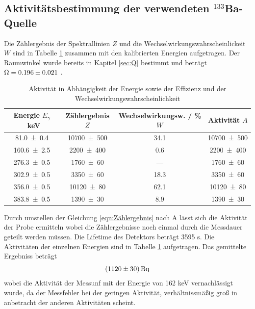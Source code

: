 \subsection{Aktivitätsbestimmung der verwendeten $^{133}$Ba-Quelle}
Die Zählergebnis der Spektrallinien $Z$ und die Wechselwirkungswahrscheinlickeit $W$ sind in Tabelle \ref{tab:Ba} zusammen mit den kalibrierten Energien aufgetragen. Der Raumwinkel wurde bereits in Kapitel \ref{sec:Q} bestimmt und beträgt $\Omega = \num{0.196 +- 0.021}$ .
\begin{table}
  \centering
  \caption{Aktivität in Abhängigkeit der Energie sowie der Effizienz und der Wechselwirkungswahrscheinlichkeit}
  \begin{tabular}{c c c c}
    \toprule
	Energie $E_\gamma$ \ keV & Zählergebnis $Z$ & Wechselwirkungsw. / \% $W$ & Aktivität $A$ \\
    \hline
    \num{81.0 +- 0.4}	& \num{10700 +- 500}	& 34.1	& \num{10700 +- 500}	\\
    \num{160.6 +- 2.5}	& \num{2200 +- 400}	& 0.6	& \num{2200 +- 400}	\\
    \num{276.3 +- 0.5}  & \num{1760 +- 60}	& --- 	& \num{1760 +- 60}	\\
    \num{302.9 +- 0.5}	& \num{3350 +- 60} 	& 18.3	& \num{3350 +- 60} 	\\
    \num{356.0 +- 0.5}	& \num{10120 +-	80}	& 62.1	& \num{10120 +-	80}	\\
    \num{383.8 +- 0.5}	& \num{1390 +- 30}	& 8.9	& \num{1390 +- 30}	\\
    \bottomrule
  \end{tabular}
  \label{tab:Ba}
\end{table}
Durch umstellen der Gleichung \ref{eqn:Zählergebnis} nach A lässt sich die Aktivität der Probe ermitteln wobei die Zählergebnisse noch einmal durch die Messdauer geteilt werden müssen. Die Lifetime des Detektors beträgt 3595 s. Die Aktivitäten der einzelnen Energien sind in Tabelle \ref{tab:Ba} aufgetragen. Das gemittelte Ergebniss beträgt
\begin{equation}
  (\num{1120 +- 30}) \, \text{Bq}
  \label{eqn:aktBq}
\end{equation}
wobei die Aktivität der Messunf mit der Energie von 162 keV vernachlässigt wurde, da der Messfehler bei der geringen Aktivität, verhältnissmäßig groß in anbetracht der anderen Aktivitäten scheint.
